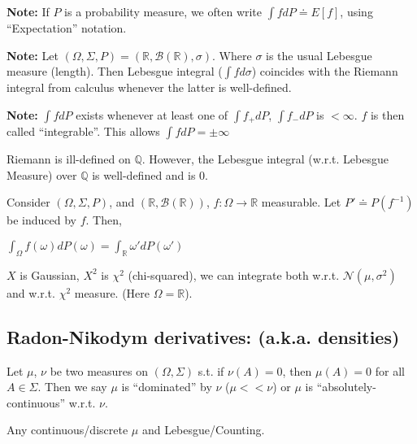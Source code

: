 \documentclass[twoside]{article}
\begin{document}
\textbf{Note:} If $P$ is a probability measure, we often write $\int f dP \doteq E[f]$, using ``Expectation'' notation.

\textbf{Note:} Let $(\Omega, \Sigma, P) = (\mathbb{R}, \mathcal{B}(\mathbb{R}), \sigma)$. Where $\sigma$ is the usual Lebesgue measure (length). Then Lebesgue integral ($\int f d\sigma$) coincides with the Riemann integral from calculus whenever the latter is well-defined.

\textbf{Note:} $\int f dP$ exists whenever at least one of $\int f_+ dP$, $\int f_- dP$ is $< \infty$. $f$ is then called ``integrable''. This allows $\int f dP = \pm \infty$

\begin{example}
  Riemann is ill-defined on $\mathbb{Q}$. However, the Lebesgue integral (w.r.t. Lebesgue Measure) over $\mathbb{Q}$ is well-defined and is 0.
\end{example}

\begin{proposition}
  Consider $(\Omega, \Sigma, P)$, and $(\mathbb{R}, \mathcal{B}(\mathbb{R}))$, $f: \Omega \rightarrow \mathbb{R}$ measurable. Let $P' \doteq P(f^{-1})$ be induced by $f$. Then,
  \begin{center}
    $\int_\Omega f(\omega)dP(\omega) = \int_{\mathbb{R}} \omega' dP(\omega')$
  \end{center}
\end{proposition}

\begin{example}
  $X$ is Gaussian, $X^2$ is $\chi^2$ (chi-squared), we can integrate both w.r.t. $\mathcal{N}(\mu, \sigma^2)$ and w.r.t. $\chi^2$ measure. (Here $\Omega = \mathbb{R}$).
\end{example}

\subsection{Radon-Nikodym derivatives: (a.k.a. densities)}

\begin{definition}
  Let $\mu$, $\nu$ be two measures on $(\Omega, \Sigma)$ s.t. if $\nu(A)=0$, then $\mu(A)=0$ for all $A \in \Sigma$. Then we say $\mu$ is ``dominated'' by $\nu$ ($\mu << \nu$) or $\mu$ is ``absolutely-continuous'' w.r.t. $\nu$.
\end{definition}

\begin{example}
  Any continuous/discrete $\mu$ and Lebesgue/Counting.
\end{example}
\end{document}
